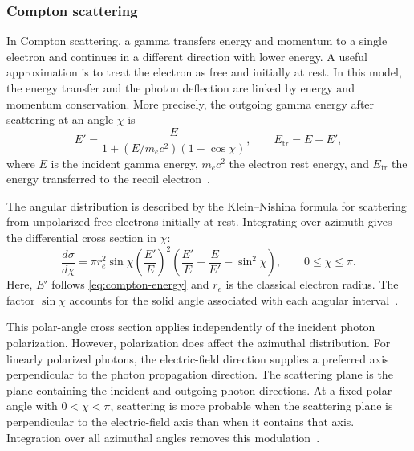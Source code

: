 \subsubsection{Compton scattering}

In Compton scattering, a gamma transfers energy and momentum to a single electron and continues in a different direction with lower energy. A useful approximation is to treat the electron as free and initially at rest. In this model, the energy transfer and the photon deflection are linked by energy and momentum conservation. More precisely, the outgoing gamma energy after scattering at an angle $\chi$ is
\begin{equation}
  E'=\frac{E}{1+(E/{m_e c^2})(1-\cos\chi)},
  \qquad E_{\mathrm{tr}}=E-E',
  \label{eq:compton-energy}
\end{equation}
where $E$ is the incident gamma energy, ${m_e c^2}$ the electron rest energy, and $E_{\mathrm{tr}}$ the energy transferred to the recoil electron~\parencite{compton1923}.

The angular distribution is described by the Klein--Nishina formula for scattering from unpolarized free electrons initially at rest. Integrating over azimuth gives the differential cross section in $\chi$:
\begin{equation}
  \frac{d\sigma}{d\chi}=\pi r_e^2\sin\chi{\left(\frac{E'}{E}\right)}^2
  \left(\frac{E'}{E}+\frac{E}{E'}-\sin^2\chi\right),
  \qquad 0\leq\chi\leq\pi.
  \label{eq:klein-nishina-angle}
\end{equation}
Here, $E'$ follows \cref{eq:compton-energy} and $r_e$ is the classical electron radius. The factor $\sin\chi$ accounts for the solid angle associated with each angular interval~\parencite{klein1929}.

This polar-angle cross section applies independently of the incident photon polarization. However, polarization does affect the azimuthal distribution. For linearly polarized photons, the electric-field direction supplies a preferred axis perpendicular to the photon propagation direction. The scattering plane is the plane containing the incident and outgoing photon directions. At a fixed polar angle with $0<\chi<\pi$, scattering is more probable when the scattering plane is perpendicular to the electric-field axis than when it contains that axis. Integration over all azimuthal angles removes this modulation~\parencite{klein1929}.

